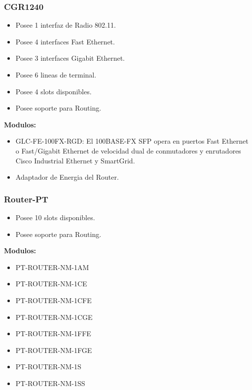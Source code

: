 \documentclass{article}
\begin{document}
\subsubsection{CGR1240}
\begin{itemize}
    \item Posee 1 interfaz de Radio 802.11.
    \item Posee 4 interfaces Fast Ethernet.
    \item Posee 3 interfaces Gigabit Ethernet.
    \item Posee 6 lineas de terminal.
    \item Posee 4 slots disponibles.
    \item Posee soporte para Routing.
\end{itemize}
\textbf{Modulos:}
\begin{itemize}
    \item GLC-FE-100FX-RGD: El 100BASE-FX SFP opera en puertos Fast Ethernet o Fast/Gigabit Ethernet de velocidad dual de conmutadores y enrutadores Cisco Industrial Ethernet y SmartGrid.
    \item Adaptador de Energia del Router.
\end{itemize}

\subsubsection{Router-PT}
\begin{itemize}
    \item Posee 10 slots disponibles.
    \item Posee soporte para Routing.
\end{itemize}
\textbf{Modulos:}
\begin{itemize}
    \item PT-ROUTER-NM-1AM
    \item PT-ROUTER-NM-1CE
    \item PT-ROUTER-NM-1CFE
    \item PT-ROUTER-NM-1CGE
    \item PT-ROUTER-NM-1FFE
    \item PT-ROUTER-NM-1FGE
    \item PT-ROUTER-NM-1S
    \item PT-ROUTER-NM-1SS
\end{itemize}
\end{document}

